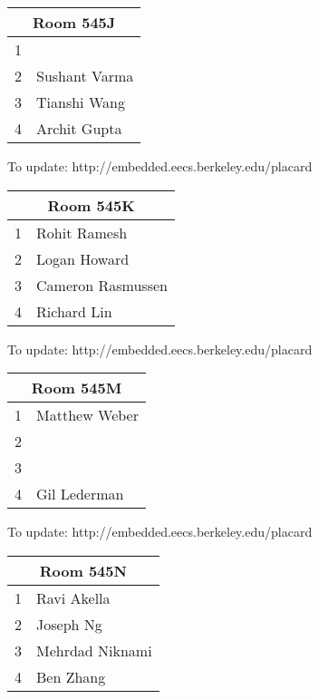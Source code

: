 \documentclass{article}
\begin{document}
\noindent
\begin{tabular}{|l|l|}
\hline
\multicolumn{2}{|c|}{Room 545J} \\ \hline\hline
1& \\
2&Sushant  Varma\\
3&Tianshi Wang\\
4&Archit Gupta\\

\hline
\end{tabular}

{\scriptsize To update: http://embedded.eecs.berkeley.edu/placard}
\vspace{1in}

\noindent
\begin{tabular}{|l|l|}
\hline
\multicolumn{2}{|c|}{Room 545K} \\ \hline\hline
1&Rohit Ramesh\\
2&Logan Howard\\
3&Cameron Rasmussen\\
4&Richard Lin\\

\hline
\end{tabular}

{\scriptsize To update: http://embedded.eecs.berkeley.edu/placard}
\vspace{1in}

\noindent
\begin{tabular}{|l|l|}
\hline
\multicolumn{2}{|c|}{Room 545M} \\ \hline\hline
1&Matthew Weber\\
2& \\
3& \\
4&Gil Lederman\\

\hline
\end{tabular}

{\scriptsize To update: http://embedded.eecs.berkeley.edu/placard}
\vspace{1in}

\noindent
\begin{tabular}{|l|l|}
\hline
\multicolumn{2}{|c|}{Room 545N} \\ \hline\hline
1&Ravi Akella\\
2&Joseph Ng\\
3&Mehrdad Niknami\\
4&Ben Zhang\\

\hline
\end{tabular}
\end{document}
